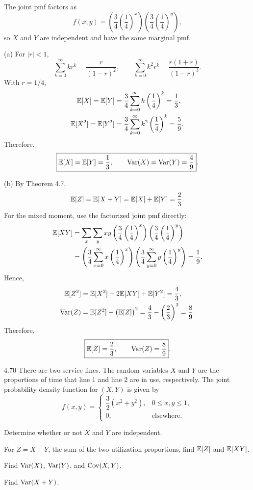\documentclass[11pt,oneside]{article}
\begin{document}
\begin{solution}
The joint pmf factors as
\[
    f(x,y)
    =\left(\frac34\left(\frac14\right)^x\right)
     \left(\frac34\left(\frac14\right)^y\right),
\]
so $X$ and $Y$ are independent and have the same marginal pmf.

\noindent\textup{(a)} For $|r|<1$,
\[
    \sum_{k=0}^{\infty}kr^k=\frac{r}{(1-r)^2},
    \qquad
    \sum_{k=0}^{\infty}k^2r^k=\frac{r(1+r)}{(1-r)^3}.
\]
With $r=1/4$,
\[
\begin{aligned}
    \mathbb{E}[X]=\mathbb{E}[Y]
    &=\frac34\sum_{k=0}^{\infty}k\left(\frac14\right)^k
      =\frac13,\\
    \mathbb{E}[X^2]=\mathbb{E}[Y^2]
    &=\frac34\sum_{k=0}^{\infty}k^2\left(\frac14\right)^k
      =\frac59.
\end{aligned}
\]
Therefore,
\[
    \boxed{\mathbb{E}[X]=\mathbb{E}[Y]=\frac13,
    \qquad
    \operatorname{Var}(X)=\operatorname{Var}(Y)=\frac49}.
\]

\medskip
\noindent\textup{(b)} By Theorem 4.7,
\[
    \mathbb{E}[Z]=\mathbb{E}[X+Y]=\mathbb{E}[X]+\mathbb{E}[Y]=\frac23.
\]
For the mixed moment, use the factorized joint pmf directly:
\[
\begin{aligned}
    \mathbb{E}[XY]
    &=\sum_x\sum_y xy
      \left(\frac34\left(\frac14\right)^x\right)
      \left(\frac34\left(\frac14\right)^y\right)\\
    &=\left(\frac34\sum_{x=0}^{\infty}x\left(\frac14\right)^x\right)
      \left(\frac34\sum_{y=0}^{\infty}y\left(\frac14\right)^y\right)
      =\frac19.
\end{aligned}
\]
Hence,
\[
\begin{aligned}
    \mathbb{E}[Z^2]
    &=\mathbb{E}[X^2]+2\mathbb{E}[XY]+\mathbb{E}[Y^2]
      =\frac43,\\
    \operatorname{Var}(Z)
    &=\mathbb{E}[Z^2]-\bigl(\mathbb{E}[Z]\bigr)^2
      =\frac43-\left(\frac23\right)^2
      =\frac89.
\end{aligned}
\]
Therefore,
\[
    \boxed{\mathbb{E}[Z]=\frac23,\qquad \operatorname{Var}(Z)=\frac89}.
\]
\end{solution}

\begin{exercise}{4.70}
There are two service lines. The random variables $X$ and $Y$ are the proportions of time that line 1 and line 2 are in use, respectively. The joint probability density function for $(X,Y)$ is given by
\[
    f(x,y)=
    \begin{cases}
        \dfrac32(x^2+y^2), & 0\leq x,y\leq1,\\
        0, & \text{elsewhere}.
    \end{cases}
\]
\begin{exercisesubparts}
    \item Determine whether or not $X$ and $Y$ are independent.
    \item For $Z=X+Y$, the sum of the two utilization proportions, find $\mathbb{E}[Z]$ and $\mathbb{E}[XY]$.
    \item Find $\operatorname{Var}(X)$, $\operatorname{Var}(Y)$, and $\operatorname{Cov}(X,Y)$.
    \item Find $\operatorname{Var}(X+Y)$.
\end{exercisesubparts}
\end{exercise}
\end{document}
